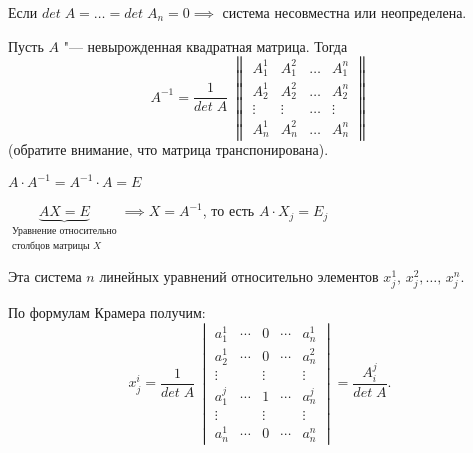 Если $det\;A = \ldots = det\;A_n = 0 \implies$ система несовместна или неопределена.

\begin{theorem}
  Пусть $A$ "--- невырожденная квадратная матрица. Тогда \begin{equation*}
    A^{-1} = \frac{1}{det\;A} \; \begin{Vmatrix}
      A_1^1& A_1^2 & \ldots & A_1^n \\
      A_2^1 & A_2^2 & \ldots & A_2^n \\
      \vdots & \vdots & \ldots & \vdots \\
      A_n^1 & A_n^2 & \ldots & A_n^n
    \end{Vmatrix}
  \end{equation*}
  (обратите внимание, что матрица транспонирована).
\end{theorem}

\begin{Proof}
  $A \cdot A^{-1} = A^{-1} \cdot A = E$

  $\underbrace{AX = E}_{\substack{\text{Уравнение относительно} \\ \text{столбцов матрицы } X}}\implies X = A^{-1}$, то есть $A \cdot X_j = E_j$

  Эта система $n$ линейных уравнений относительно элементов $x_j^1, \, x_j^2, \ldots,\, x_j^n$.

  По формулам Крамера получим:
  \begin{equation*}
    x_j^i = \frac{1}{det\;A}\, \begin{vmatrix}
      a_1^1 & \cdots & 0 & \cdots & a_n^1 \\
      a_2^1 & \cdots & 0 & \cdots & a_n^2 \\
      \vdots && \vdots && \vdots \\
      a_1^j & \cdots & 1 & \cdots & a_n^j \\
      \vdots && \vdots && \vdots \\
      a_n^1 & \cdots & 0 & \cdots & a_n^n
    \end{vmatrix} = \frac{A_i^j}{det\;A}.
  \end{equation*}
\end{Proof}

